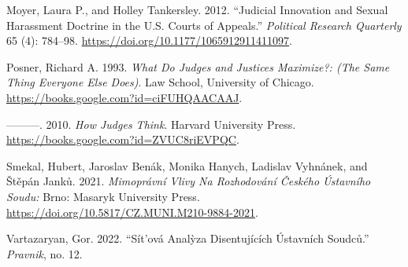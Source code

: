 \documentclass[
  11pt,
]{article}
\newlength{\cslhangindent}
\newenvironment{CSLReferences}[2] %
 {%
  \setlength{\parindent}{0pt}
  \ifodd #1 \everypar{\setlength{\hangindent}{\cslhangindent}}\ignorespaces\fi
  \ifnum #2 > 0
  \setlength{\parskip}{#2\baselineskip}
  \fi
 }%
 {}
\begin{document}
\begin{CSLReferences}{1}{0}
\leavevmode{}%
Moyer, Laura P., and Holley Tankersley. 2012. {``Judicial {Innovation}
and {Sexual Harassment Doctrine} in the {U}.{S}. {Courts} of
{Appeals}.''} \emph{Political Research Quarterly} 65 (4): 784--98.
\url{https://doi.org/10.1177/1065912911411097}.

\leavevmode{}%
Posner, Richard A. 1993. \emph{What {Do Judges} and {Justices
Maximize}?: (The {Same Thing Everyone Else Does})}. {Law School,
University of Chicago}. \url{https://books.google.com?id=ciFUHQAACAAJ}.

\leavevmode{}%
---------. 2010. \emph{How {Judges Think}}. {Harvard University Press}.
\url{https://books.google.com?id=ZVUC8riEVPQC}.

\leavevmode{}%
Smekal, Hubert, Jaroslav Benák, Monika Hanych, Ladislav Vyhnánek, and
Štěpán Janků. 2021. \emph{Mimoprávní Vlivy Na Rozhodování Českého
{Ústavního} Soudu:} {Brno}: {Masaryk University Press}.
\url{https://doi.org/10.5817/CZ.MUNI.M210-9884-2021}.

\leavevmode{}%
Vartazaryan, Gor. 2022. {``Sít'ová Analỳza Disentujících Ústavních
Soudců.''} \emph{Pravnik}, no. 12.

\end{CSLReferences}
\end{document}
